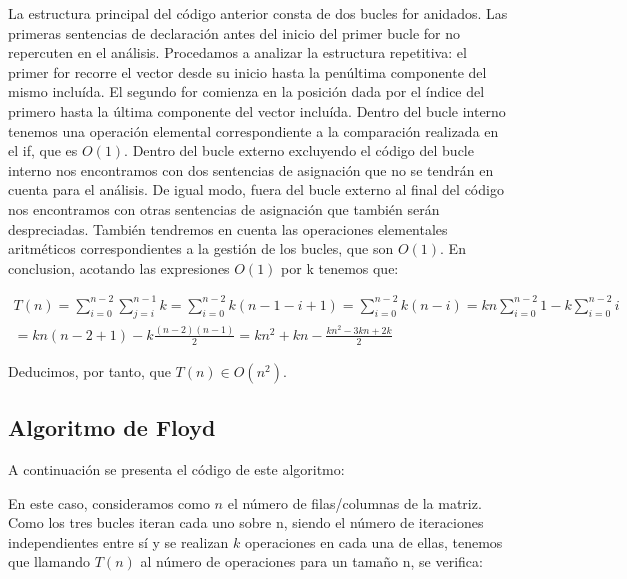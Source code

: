 \documentclass{homework}
\begin{document}
    La estructura principal del código anterior consta de dos bucles for anidados. Las primeras sentencias de declaración antes del inicio del primer 
    bucle for no repercuten en el análisis. Procedamos a analizar la estructura repetitiva: el primer for recorre el vector desde su inicio hasta
    la penúltima componente del mismo incluída. El segundo for comienza en la posición dada por el índice del primero hasta la última componente del vector incluída.
    Dentro del bucle interno tenemos una operación elemental correspondiente a la comparación realizada en el if, que es $O(1)$. Dentro del bucle externo excluyendo 
    el código del bucle interno nos encontramos con dos sentencias de asignación que no se tendrán en cuenta para el análisis. De igual modo, fuera del bucle externo
    al final del código nos encontramos con otras sentencias de asignación que también serán despreciadas. También tendremos en cuenta las operaciones elementales
    aritméticos correspondientes a la gestión de los bucles, que son $O(1)$. En conclusion, acotando las expresiones $O(1)$ por k tenemos que: 

    \begin{equation*}
        \begin{split}
            T(n) = \sum_{i=0}^{n-2} \sum_{j=i}^{n-1} k = \sum_{i=0}^{n-2} k(n-1-i+1) = \sum_{i=0}^{n-2} k(n-i) = kn \sum_{i=0}^{n-2} 1  - k \sum_{i=0}^{n-2} i \\
            = kn(n-2+1) - k \frac{(n-2)(n-1)}{2} = kn^2 + kn - \frac{kn^2 - 3kn + 2k}{2}
        \end{split}
    \end{equation*}
    
    Deducimos, por tanto, que $T(n) \in O(n^2)$. 
    
    \subsection{Algoritmo de Floyd}

    A continuación se presenta el código de este algoritmo:

    

    En este caso, consideramos como $n$ el número de filas/columnas de la matriz. Como los tres bucles iteran cada uno sobre n, siendo el número de iteraciones
    independientes entre sí y se realizan $k$ operaciones en cada una de ellas, tenemos que llamando $T(n)$ al número de operaciones para un tamaño n, se verifica:
    
\end{document}
